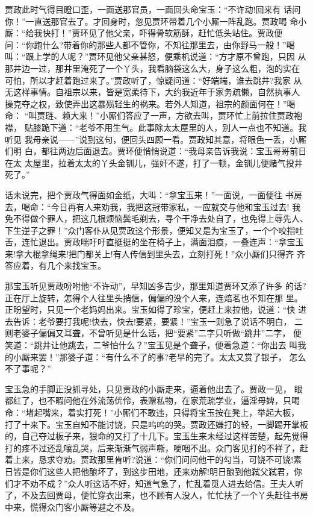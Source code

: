 贾政此时气得目瞪口歪，一面送那官员，一面回头命宝玉：“不许动!回来有
话问你！”一直送那官去了。才回身时，忽见贾环带着几个小厮一阵乱跑。贾政喝
命小厮：“给我快打！”贾环见了他父亲，吓得骨软筋酥，赶忙低头站住。贾政便
问：“你跑什么?带着你的那些人都不管你，不知往那里去，由你野马一般！”喝
叫：“跟上学的人呢？”贾环见他父亲甚怒，便乘机说道：“方才原不曾跑，只因
从那井边一过，那井里淹死了一个丫头，我看脑袋这么大，身子这么粗，泡的实在
可怕，所以才赶着跑过来了。”贾政听了，惊疑问道：“好端端，谁去跳井?我家
从无这样事情。自祖宗以来，皆是宽柔待下，大约我近年于家务疏懒，自然执事人
操克夺之权，致使弄出这暴殒轻生的祸来。若外人知道，祖宗的颜面何在！”喝命：
“叫贾琏、赖大来！”小厮们答应了一声，方欲去叫，贾环忙上前拉住贾政袍襟，
贴膝跪下道：“老爷不用生气。此事除太太屋里的人，别人一点也不知道。我听见
我母亲说——”说到这句，便回头四顾一看。贾政知其意，将眼色一丢，小厮们明
白，都往两边后面退去。贾环便悄悄说道：“我母亲告诉我说：宝玉哥哥前日在太
太屋里，拉着太太的丫头金钏儿，强奸不遂，打了一顿，金钏儿便赌气投井死了。”

话未说完，把个贾政气得面如金纸，大叫：“拿宝玉来！”一面说，一面便往
书房去，喝命：“今日再有人来劝我，我把这冠带家私，一应就交与他和宝玉过去!
我免不得做个罪人，把这几根烦恼鬓毛剃去，寻个干净去处自了，也免得上辱先人、
下生逆子之罪！”众门客仆从见贾政这个形景，便知又是为宝玉了，一个个咬指吐
舌，连忙退出。贾政喘吁吁直挺挺的坐在椅子上，满面泪痕，一叠连声：“拿宝玉
来!拿大棍拿绳来!把门都关上!有人传信到里头去，立刻打死！”众小厮们只得齐
齐答应着，有几个来找宝玉。

那宝玉听见贾政吩咐他“不许动”，早知凶多吉少，那里知道贾环又添了许多
的话?正在厅上旋转，怎得个人往里头捎信，偏偏的没个人来，连焙茗也不知在那
里。正盼望时，只见一个老妈妈出来。宝玉如得了珍宝，便赶上来拉他，说道：“快
进去告诉：老爷要打我呢!快去，快去!要紧，要紧！”宝玉一则急了说话不明白，
二则老婆子偏偏又耳聋，不曾听见是什么话，把“要紧”二字只听做“跳井”二字，
便笑道：“跳井让他跳去，二爷怕什么？”宝玉见是个聋子，便着急道：“你出去
叫我的小厮来罢！”那婆子道：“有什么不了的事?老早的完了。太太又赏了银子，
怎么不了事呢？”

宝玉急的手脚正没抓寻处，只见贾政的小厮走来，逼着他出去了。贾政一见，
眼都红了，也不暇问他在外流荡优伶，表赠私物，在家荒疏学业，逼淫母婢，只喝
命：“堵起嘴来，着实打死！”小厮们不敢违，只得将宝玉按在凳上，举起大板，
打了十来下。宝玉自知不能讨饶，只是呜呜的哭。贾政还嫌打的轻，一脚踢开掌板
的，自己夺过板子来，狠命的又打了十几下。宝玉生来未经过这样苦楚，起先觉得
打的疼不过还乱嚷乱哭，后来渐渐气弱声嘶，哽咽不出。众门客见打的不祥了，赶
着上来，恳求夺劝。贾政那里肯听?说道：“你们问问他干的勾当，可饶不可饶!素
日皆是你们这些人把他酿坏了，到这步田地，还来劝解!明日酿到他弑父弑君，你
们才不劝不成？”众人听这话不好，知道气急了，忙乱着觅人进去给信。王夫人听
了，不及去回贾母，便忙穿衣出来，也不顾有人没人，忙忙扶了一个丫头赶往书房
中来，慌得众门客小厮等避之不及。

